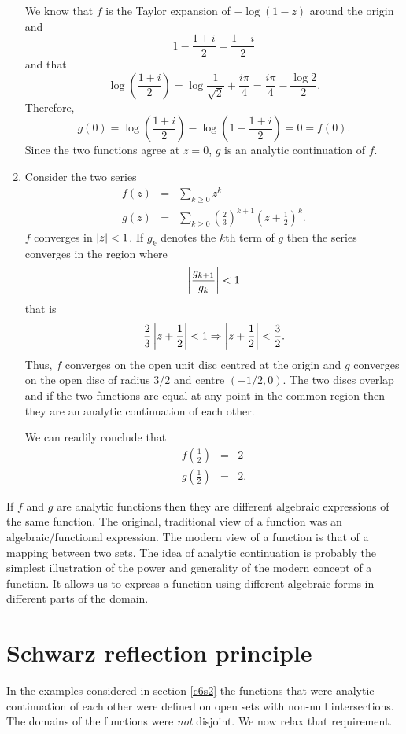 \begin{enumerate}
We know that $f$ is the Taylor expansion of $-\log(1 - z)$ around the origin and
\[
1 - \frac{1 + i}{2} = \frac{1 - i}{2}
\]
and that
\[
\log\left(\frac{1 + i}{2}\right) = \log\frac{1}{\sqrt{2}} + \frac{i\pi}{4}
= \frac{i\pi}{4} - \frac{\log 2}{2}.
\]
Therefore,
\[
g(0) = \log\left(\frac{1 + i}{2}\right) - \log\left(1 - \frac{1 + i}{2}\right) = 0 = f(0).
\]
Since the two functions agree at $z = 0$, $g$ is an analytic continuation of $f$.

\item Consider the two series \cite{dk}
\begin{eqnarray}
f(z) &=& \sum_{k \ge 0}z^k \label{c6s2e3} \\
g(z) &=& \sum_{k \ge 0}\left(\frac{2}{3}\right)^{k+1}\left(z + \frac{1}{2}\right)^k.
\label{c6s3e4}
\end{eqnarray}
$f$ converges in $\left\vert{z}\right\vert < 1$. If $g_k$ denotes the $k$th term of $g$ then the series
converges in the region where
\[
\left\vert{\frac{g_{k+1}}{g_k}}\right\vert < 1
\]
that is
\[
\frac{2}{3}\left\vert{z + \frac{1}{2}}\right\vert < 1 \Rightarrow \left\vert{z + \frac{1}{2}}\right\vert < \frac{3}{2}.
\]
Thus, $f$ converges on the open unit disc centred at the origin and $g$ converges on
the open disc of radius $3/2$ and centre $(-1/2, 0)$. The two discs overlap and if the
two functions are equal at any point in the common region then they are an analytic
continuation of each other.

We can readily conclude that
\begin{eqnarray*}
f\left(\frac{1}{2}\right) &=& 2 \\
g\left(\frac{1}{2}\right) &=& 2.
\end{eqnarray*}
\end{enumerate}

If $f$ and $g$ are analytic functions then they are different algebraic expressions of
the same function. The original, traditional view of a function was an algebraic/functional
expression. The modern view of a function is that of a mapping between two sets. The idea
of analytic continuation is probably the simplest illustration of the power and generality
of the modern concept of a function. It allows us to express a function using different
algebraic forms in different parts of the domain.

\section{Schwarz reflection principle}\label{c6s3}
In the examples considered in section \ref{c6s2} the functions that were analytic 
continuation of each other were defined on open sets with non-null intersections. The
domains of the functions were \emph{not} disjoint. We now relax that requirement.

